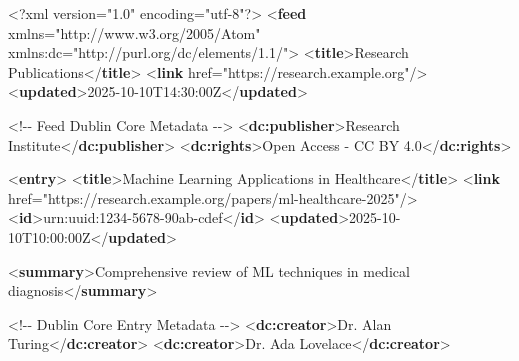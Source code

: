 \documentclass[
  letterpaper,
  DIV=11,
  numbers=noendperiod]{scrartcl}
\newenvironment{Shaded}{\begin{snugshade}}{\end{snugshade}}
\newcommand{\CommentTok}[1]{\textcolor[rgb]{0.37,0.37,0.37}{#1}}
\newcommand{\FunctionTok}[1]{\textcolor[rgb]{0.28,0.35,0.67}{#1}}
\newcommand{\KeywordTok}[1]{\textcolor[rgb]{0.00,0.23,0.31}{\textbf{#1}}}
\newcommand{\NormalTok}[1]{\textcolor[rgb]{0.00,0.23,0.31}{#1}}
\newcommand{\OtherTok}[1]{\textcolor[rgb]{0.00,0.23,0.31}{#1}}
\newcommand{\StringTok}[1]{\textcolor[rgb]{0.13,0.47,0.30}{#1}}
\begin{document}
\begin{Shaded}
\begin{Highlighting}[]
\FunctionTok{\textless{}?xml}\OtherTok{ version=}\StringTok{"1.0"}\OtherTok{ encoding=}\StringTok{"utf{-}8"}\FunctionTok{?\textgreater{}}
\NormalTok{\textless{}}\KeywordTok{feed}\OtherTok{ xmlns=}\StringTok{"http://www.w3.org/2005/Atom"}
\OtherTok{      xmlns:dc=}\StringTok{"http://purl.org/dc/elements/1.1/"}\NormalTok{\textgreater{}}
\NormalTok{  \textless{}}\KeywordTok{title}\NormalTok{\textgreater{}Research Publications\textless{}/}\KeywordTok{title}\NormalTok{\textgreater{}}
\NormalTok{  \textless{}}\KeywordTok{link}\OtherTok{ href=}\StringTok{"https://research.example.org"}\NormalTok{/\textgreater{}}
\NormalTok{  \textless{}}\KeywordTok{updated}\NormalTok{\textgreater{}2025{-}10{-}10T14:30:00Z\textless{}/}\KeywordTok{updated}\NormalTok{\textgreater{}}
  
  \CommentTok{\textless{}!{-}{-} Feed Dublin Core Metadata {-}{-}\textgreater{}}
\NormalTok{  \textless{}}\KeywordTok{dc:publisher}\NormalTok{\textgreater{}Research Institute\textless{}/}\KeywordTok{dc:publisher}\NormalTok{\textgreater{}}
\NormalTok{  \textless{}}\KeywordTok{dc:rights}\NormalTok{\textgreater{}Open Access {-} CC BY 4.0\textless{}/}\KeywordTok{dc:rights}\NormalTok{\textgreater{}}
  
\NormalTok{  \textless{}}\KeywordTok{entry}\NormalTok{\textgreater{}}
\NormalTok{    \textless{}}\KeywordTok{title}\NormalTok{\textgreater{}Machine Learning Applications in Healthcare\textless{}/}\KeywordTok{title}\NormalTok{\textgreater{}}
\NormalTok{    \textless{}}\KeywordTok{link}\OtherTok{ href=}\StringTok{"https://research.example.org/papers/ml{-}healthcare{-}2025"}\NormalTok{/\textgreater{}}
\NormalTok{    \textless{}}\KeywordTok{id}\NormalTok{\textgreater{}urn:uuid:1234{-}5678{-}90ab{-}cdef\textless{}/}\KeywordTok{id}\NormalTok{\textgreater{}}
\NormalTok{    \textless{}}\KeywordTok{updated}\NormalTok{\textgreater{}2025{-}10{-}10T10:00:00Z\textless{}/}\KeywordTok{updated}\NormalTok{\textgreater{}}
    
\NormalTok{    \textless{}}\KeywordTok{summary}\NormalTok{\textgreater{}Comprehensive review of ML techniques in medical diagnosis\textless{}/}\KeywordTok{summary}\NormalTok{\textgreater{}}
    
    \CommentTok{\textless{}!{-}{-} Dublin Core Entry Metadata {-}{-}\textgreater{}}
\NormalTok{    \textless{}}\KeywordTok{dc:creator}\NormalTok{\textgreater{}Dr. Alan Turing\textless{}/}\KeywordTok{dc:creator}\NormalTok{\textgreater{}}
\NormalTok{    \textless{}}\KeywordTok{dc:creator}\NormalTok{\textgreater{}Dr. Ada Lovelace\textless{}/}\KeywordTok{dc:creator}\NormalTok{\textgreater{}}
    

\end{Highlighting}
\end{Shaded}
\end{document}
